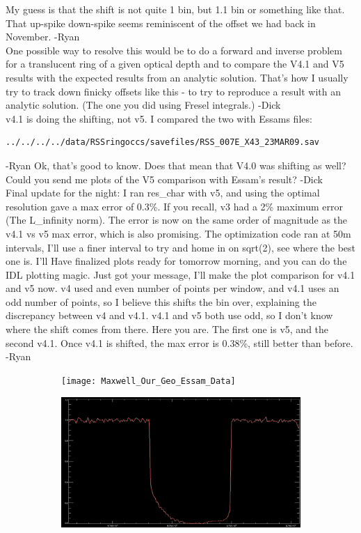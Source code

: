 \documentclass[crop=false,class=article,oneside]{standalone}
\begin{document}
My guess is that the shift is not quite 1 bin, but 1.1 bin or something like that. That up-spike down-spike seems reminiscent of the offset we had back in November. -Ryan\\
One possible way to resolve this would be to do a forward and inverse problem for a translucent ring of a given optical depth and to compare the V4.1 and V5 results with the expected results from an analytic solution. That's how I usually try to track down finicky offsets like this - to try to reproduce a result with an analytic solution. (The one you did using Fresel integrals.) -Dick\\
v4.1 is doing the shifting, not v5. I compared the two with Essams files:
\begin{lstlisting}[language=bash]
../../../../data/RSSringoccs/savefiles/RSS_007E_X43_23MAR09.sav
\end{lstlisting}
-Ryan
Ok, that's good to know. Does that mean that V4.0 was shifting as well? Could you send me plots of the V5 comparison with Essam's result? -Dick\\
Final update for the night: I ran res\_char with v5, and using the optimal resolution gave a max error of 0.3\%. If you recall, v3 had a 2\% maximum error (The L\_infinity norm). The error is now on the same order of magnitude as the v4.1 vs v5 max error, which is also promising. The optimization code ran at 50m intervals, I'll use a finer interval to try and home in on sqrt(2), see where the best one is. I'll Have finalized plots ready for tomorrow morning, and you can do the IDL plotting magic. Just got your message, I'll make the plot comparison for v4.1 and v5 now. v4 used and even number of points per window, and v4.1 uses an odd number of points, so I believe this shifts the bin over, explaining the discrepancy between v4 and v4.1. v4.1 and v5 both use odd, so I don't know where the shift comes from there. Here you are. The first one is v5, and the second v4.1. Once v4.1 is shifted, the max error is 0.38\%, still better than before. -Ryan
\begin{figure}[H]
    \centering
    \begin{subfigure}[b]{0.49\textwidth}
        \texttt{[image: Maxwell\_Our\_Geo\_Essam\_Data]}
    \end{subfigure}
    \begin{subfigure}[b]{0.49\textwidth}
        \includegraphics[width=\textwidth]{images/Maxwell_v4_1.png}
    \end{subfigure}
\end{figure}
\end{document}
